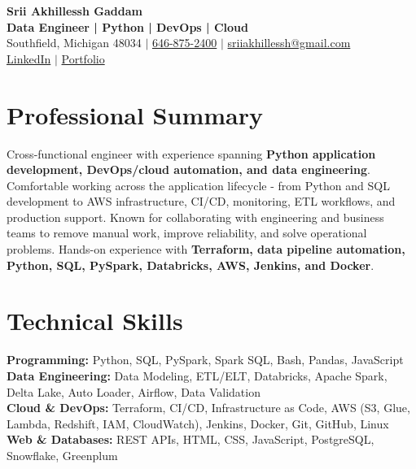 \documentclass[letterpaper,10pt]{article}
\begin{document}
\fontsize{9.35pt}{10.45pt}\selectfont

\begin{center}
    {\LARGE \textbf{Srii Akhillessh Gaddam}} \\[-1pt]
    \textbf{Data Engineer | Python | DevOps | Cloud} \\[2pt]
    Southfield, Michigan 48034 $|$
    \href{tel:6468752400}{646-875-2400} $|$
    \href{mailto:sriiakhillessh@gmail.com}{sriiakhillessh@gmail.com} \\[1pt]
    \href{https://www.linkedin.com/in/srii-akhiilessh-gaddam-b48668191/}{LinkedIn} $|$
    \href{https://sriiakhillesshg.github.io/portfolio/}{Portfolio}
\end{center}
\vspace{-8pt}

\section{Professional Summary}
\small{Cross-functional engineer with experience spanning \textbf{Python application development, DevOps/cloud automation, and data engineering}. Comfortable working across the application lifecycle - from Python and SQL development to AWS infrastructure, CI/CD, monitoring, ETL workflows, and production support. Known for collaborating with engineering and business teams to remove manual work, improve reliability, and solve operational problems. Hands-on experience with \textbf{Terraform, data pipeline automation, Python, SQL, PySpark, Databricks, AWS, Jenkins, and Docker}.}

\section{Technical Skills}
\small{
\textbf{Programming:} Python, SQL, PySpark, Spark SQL, Bash, Pandas, JavaScript \\
\textbf{Data Engineering:} Data Modeling, ETL/ELT, Databricks, Apache Spark, Delta Lake, Auto Loader, Airflow, Data Validation \\
\textbf{Cloud \& DevOps:} Terraform, CI/CD, Infrastructure as Code, AWS (S3, Glue, Lambda, Redshift, IAM, CloudWatch), Jenkins, Docker, Git, GitHub, Linux \\
\textbf{Web \& Databases:} REST APIs, HTML, CSS, JavaScript, PostgreSQL, Snowflake, Greenplum
}
\end{document}
